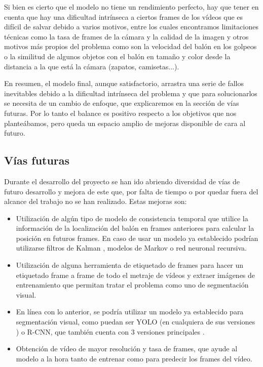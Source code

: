 Si bien es cierto que el modelo no tiene un rendimiento perfecto, hay que tener en cuenta que hay una dificultad intrínseca a ciertos frames de los vídeos que es difícil de salvar debido a varios motivos, entre los cuales encontramos limitaciones técnicas como la tasa de frames de la cámara y la calidad de la imagen y otros motivos más propios del problema como son la velocidad del balón en los golpeos o la similitud de algunos objetos con el balón en tamaño y color desde la distancia a la que está la cámara (zapatos, camisetas...).

En resumen, el modelo final, aunque satisfactorio, arrastra una serie de fallos inevitables debido a la dificultad intrínseca del problema y que para solucionarlos se necesita de un cambio de enfoque, que explicaremos en la sección de vías futuras. Por lo tanto el balance es positivo respecto a los objetivos que nos planteábamos, pero queda un espacio amplio de mejoras disponible de cara al futuro.



\subsection{Vías futuras}

Durante el desarrollo del proyecto se han ido abriendo diversidad de vías de futuro desarrollo y mejora de este que, por falta de tiempo o por quedar fuera del alcance del trabajo no se han realizado. Estas mejoras son:

\begin{itemize}
    \item Utilización de algún tipo de modelo de consistencia temporal que utilice la información de la localización del balón en frames anteriores para calcular la posición en futuros frames. En caso de usar un modelo ya establecido podrían utilizarse filtros de Kalman \cite{Thrun:2005:PR:1121596}, modelos de Markov o red neuronal recursiva.
    \item Utilización de alguna herramienta de etiquetado de frames \cite{dutta2016via} para hacer un etiquetado frame a frame de todo el metraje de vídeos y extraer imágenes de entrenamiento que permitan tratar el problema como uno de segmentación visual.
    \item En línea con lo anterior, se podría utilizar un modelo ya establecido para segmentación visual, como puedan ser YOLO (en cualquiera de sus versiones \cite{art:yolo,art:yolo2,art:yolo3}) o R-CNN, que también cuenta con 3 versiones principales \cite{art:RCNN, art:fastRCNN, art:fasterRCNN}.
    \item Obtención de vídeo de mayor resolución y tasa de frames, que ayude al modelo a la hora tanto de entrenar como para predecir los frames del vídeo.
\end{itemize}